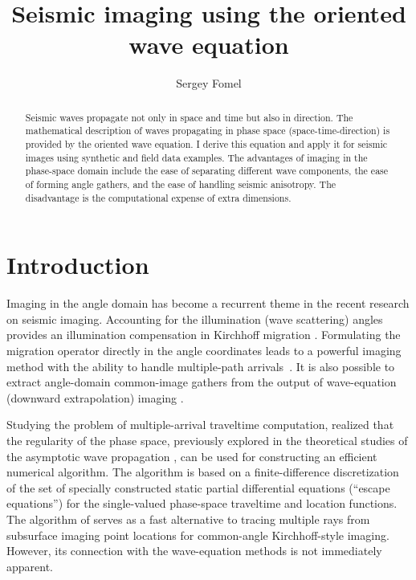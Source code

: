 \title{Seismic imaging using the oriented wave equation}
\author{Sergey Fomel}

\maketitle

\begin{abstract}
Seismic waves propagate not only in space and time but also in
direction. The mathematical description of waves propagating in phase
space (space-time-direction) is provided by the oriented wave
equation. I derive this equation and apply it for seismic images using
synthetic and field data examples. The advantages of imaging in the
phase-space domain include the ease of separating different wave
components, the ease of forming angle gathers, and the ease of
handling seismic anisotropy. The disadvantage is the computational
expense of extra dimensions.
\end{abstract}

\section{Introduction}

Imaging in the angle domain has become a recurrent theme in the recent
research on seismic imaging. Accounting for the illumination (wave scattering)
angles provides an illumination compensation in Kirchhoff migration
\cite[]{SEG-1999-13581361,SEG-1999-13621365,SEG-2002-11881191,SEG-2003-09210924}.
Formulating the migration operator directly in the angle coordinates leads to
a powerful imaging method with the ability to handle multiple-path
arrivals~\cite[]{SEG-1998-1538,SEG-2002-11961199,GEO68-01-02320254}.  It is also
possible to extract angle-domain common-image gathers from the output of
wave-equation (do\-wnward extrapolation) imaging
\cite[]{SEG-1999-08240827,GEO67-03-08830889,SEG-2002-13601363,GEO68-03-10651074}.

Studying the problem of multiple-arrival traveltime computation,
\cite{pnas,jcp} realized that the regularity of the phase space,
previously explored in the theoretical studies of the asymptotic wave
propagation \cite[]{maslov}, can be used for constructing an efficient numerical
algorithm.  The algorithm is based on a finite-difference discretization of
the set of specially constructed static partial differential equations
(``escape equations'') for the single-valued phase-space traveltime and
location functions. The algorithm of \cite{pnas} serves as a fast
alternative to tracing multiple rays from subsurface imaging point locations
for common-angle Kirchhoff-style imaging.  However, its connection with the
wave-equation methods is not immediately apparent.

